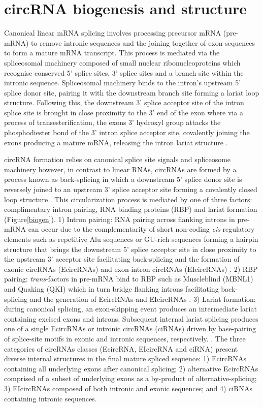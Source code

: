 \documentclass[journal,review,submit,pdftex,moreauthors]{Definitions/mdpi}
\begin{document}
\section{circRNA biogenesis and structure}
Canonical linear mRNA splicing involves processing precursor mRNA (pre-mRNA) to remove intronic sequences and the joining together of exon sequences to form a mature mRNA transcript. This process is mediated via the spliceosomal machinery composed of small nuclear ribonucleoproteins which recognise conserved 5' splice sites,  3' splice sites and a branch site within the intronic sequence. Spliceosomal machinery binds to the intron's upstream 5' splice donor site, pairing it with the downstream branch site forming a lariat loop structure. Following this, the downstream 3' splice acceptor site of the intron splice site is brought in close proximity to the 3' end of the exon where via a process of transesterification, the exons 3' hydroxyl group attacks the phosphodiester bond of the 3' intron splice acceptor site, covalently joining the exons producing a mature mRNA, releasing the intron lariat structure \cite{BibEntry2019Dec}. \par
circRNA formation relies on canonical splice site signals and spliceosome machinery \cite{Starke2015Jan} however, in contrast to linear RNAs, circRNAs are formed by a process known as back-splicing in which a downstream 5' splice donor site is reversely joined to an upstream 3' splice acceptor site forming a covalently closed loop structure \cite{Jeck2012Dec, Jeck2014May}. This circularization process is mediated by one of three factors: complimentary intron pairing, RNA binding proteins (RBP) and lariat formation (Figure\ref{biogen}). 1) Intron pairing: RNA pairing across flanking introns in pre-mRNA can occur due to the complementarity of short non-coding \textit{cis} regulatory elements such as repetitive Alu sequences or GU-rich sequences forming a hairpin structure that brings the downstream 5' splice acceptor site in close proximity to the upstream 3' acceptor site facilitating back-splicing and the formation of exonic circRNAs (EcircRNAs) and exon-intron circRNAs (EIcircRNAs) \cite{Wilusz2015May, Zhang2014Sep}. 2) RBP pairing: \textit{trans}-factors in pre-mRNA bind to RBP such as Muscleblind (MBNL1) and Quaking (QKI) which in turn bridge flanking introns facilitating back-splicing and the generation of EcircRNAs and EIcircRNAs \cite{Singh2022Jan, Chen2015Apr}. 3) Lariat formation: during canonical splicing, an exon-skipping event produces an intermediate lariat containing excised exons and introns. Subsequent internal lariat splicing produces one of a single EcircRNAs \cite{Zaphiropoulos1996} or intronic circRNAs (ciRNAs) driven by base-pairing of splice-site motifs in exonic and intronic sequences, respectively. \cite{ZHANG2013}. The three categories of circRNAs classes (EcircRNA, EIcircRNA and ciRNA) present diverse internal structures in the final mature spliced sequence: 1) EcircRNAs containing all underlying exons after canonical splicing; 2) alternative EcircRNAs comprised of a subset of underlying exons as a by-product of alternative-splicing; 3) EIcircRNAs composed of both intronic and exonic sequences; and 4) ciRNAs containing intronic sequences. \par
\end{document}
